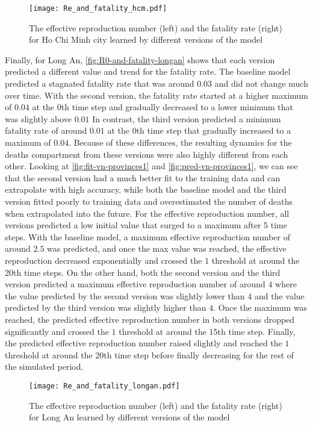 \begin{figure}[!htb]
    \centering
    \texttt{[image: Re\_and\_fatality\_hcm.pdf]}
    \caption{The effective reproduction number (left) and the fatality rate (right) for Ho Chi Minh city learned by different versions of the model}
    \label{fig:R0-and-fatality-hochiminh}
\end{figure}

Finally, for Long An, \autoref{fig:R0-and-fatality-longan} shows that each version predicted a different value and trend for the fatality rate.
The baseline model predicted a stagnated fatality rate that was around $0.03$ and did not change much over time.
With the second version, the fatality rate started at a higher maximum of $0.04$ at the 0th time step and gradually decreased to a lower minimum that was slightly above $0.01$
In contrast, the third version predicted a minimum fatality rate of around $0.01$ at the 0th time step that gradually increased to a maximum of $0.04$.
Because of these differences, the resulting dynamics for the deaths compartment from these versions were also highly different from each other.
Looking at \autoref{fig:fit-vn-provinces1} and \autoref{fig:pred-vn-provinces1}, we can see that the second version had a much better fit to the training data and can extrapolate with high accuracy, while both the baseline model and the third version fitted poorly to training data and overestimated the number of deaths when extrapolated into the future.
For the effective reproduction number, all versions predicted a low initial value that surged to a maximum after 5 time steps.
With the baseline model, a maximum effective reproduction number of around $2.5$ was predicted, and once the max value was reached, the effective reproduction decreased exponentially and crossed the $1$ threshold at around the 20th time steps.
On the other hand, both the second version and the third version predicted a maximum effective reproduction number of around $4$ where the value predicted by the second version was slightly lower than $4$ and the value predicted by the third version was slightly higher than $4$.
Once the maximum was reached, the predicted effective reproduction number in both versions dropped significantly and crossed the $1$ threshold at around the 15th time step.
Finally, the predicted effective reproduction number raised slightly and reached the $1$ threshold at around the 20th time step before finally decreasing for the rest of the simulated period.

\begin{figure}[!htb]
    \centering
    \texttt{[image: Re\_and\_fatality\_longan.pdf]}
    \caption{The effective reproduction number (left) and the fatality rate (right) for Long An learned by different versions of the model}
    \label{fig:R0-and-fatality-longan}
\end{figure}
